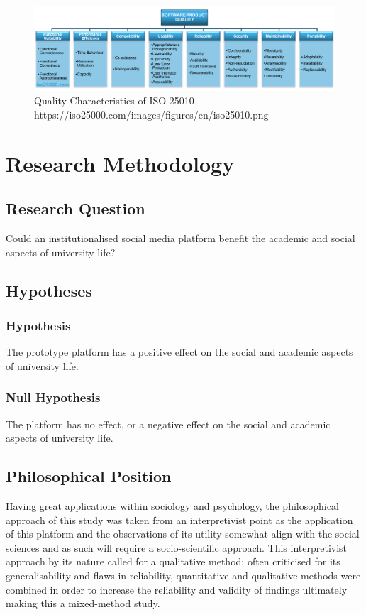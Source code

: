 \documentclass[lettersize,journal]{IEEEtran}
\begin{document}
        \begin{figure}[h!]
                \includegraphics[width=\linewidth]{images/iso.png}
                \caption{Quality Characteristics of ISO 25010 - https://iso25000.com/images/figures/en/iso25010.png}
                \label{figure 2}
        \end{figure}





\section{Research Methodology}

	\subsection{Research Question}
		Could an institutionalised social media platform benefit the academic and social aspects of university life?

	\subsection{Hypotheses}
		\subsubsection{Hypothesis}
		The prototype platform has a positive effect on the social and academic aspects of university life.
\\
		\subsubsection{Null Hypothesis}
		The platform has no effect, or a negative effect on the social and academic aspects of university life.


        \subsection{Philosophical Position}
        Having great applications within sociology and psychology, the philosophical approach of this study was taken from an 
        interpretivist point as the application of this platform and the observations of its utility somewhat align with the social
         sciences and as such will require a socio-scientific approach. This interpretivist approach by its nature called for a qualitative
         method; often criticised for its generalisability and flaws in reliability, quantitative and qualitative methods were combined
         in order to increase the reliability and validity of findings ultimately making this a mixed-method study.
\end{document}
